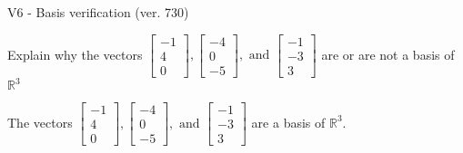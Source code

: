 \begin{exercise}
  \begin{exerciseTitle}V6 - Basis verification (ver. 730)\end{exerciseTitle}
  \begin{exerciseStatement}
    Explain why the vectors \(\left[\begin{array}{r}
-1 \\
4 \\
0
\end{array}\right] , \left[\begin{array}{r}
-4 \\
0 \\
-5
\end{array}\right] , \text{ and } \left[\begin{array}{r}
-1 \\
-3 \\
3
\end{array}\right]\) are or are not a basis of \(\mathbb{R}^3\)	


  \end{exerciseStatement}
  \begin{exerciseAnswer}
   The vectors \(\left[\begin{array}{r}
-1 \\
4 \\
0
\end{array}\right] , \left[\begin{array}{r}
-4 \\
0 \\
-5
\end{array}\right] , \text{ and } \left[\begin{array}{r}
-1 \\
-3 \\
3
\end{array}\right]\) 
  	 are  a basis of \(\mathbb{R}^3\).
  


  \end{exerciseAnswer}
\end{exercise}